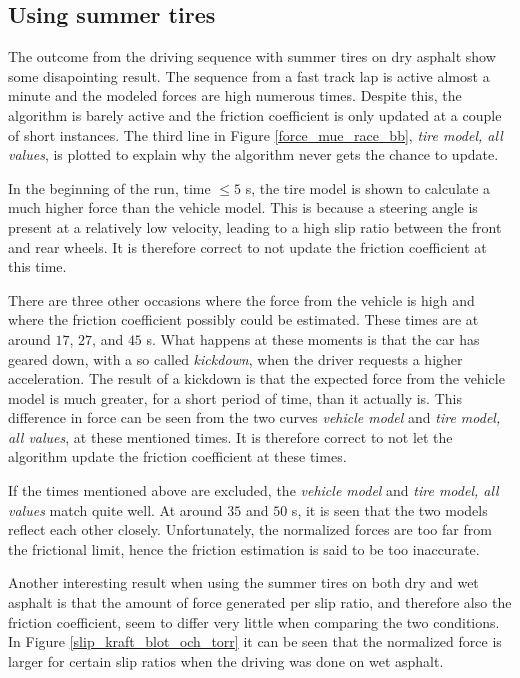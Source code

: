 \subsection{Using summer tires}
The outcome from the driving sequence with summer tires on dry asphalt show some disapointing result. The sequence from a fast track lap is active almost a minute and the modeled forces are high numerous times. Despite this, the algorithm is barely active and the friction coefficient is only updated at a couple of short instances. The third line in Figure \ref{force_mue_race_bb}, \textit{tire model, all values}, is plotted to explain why the algorithm never gets the chance to update.

In the beginning of the run, time $ \leq 5 $ s, the tire model is shown to calculate a much higher force than the vehicle model. This is because a steering angle is present at a relatively low velocity, leading to a high slip ratio between the front and rear wheels. It is therefore correct to not update the friction coefficient at this time. 

There are three other occasions where the force from the vehicle is high and where the friction coefficient possibly could be estimated. These times are at around $ 17 $, $ 27 $, and $ 45 $ s. What happens at these moments is that the car has geared down, with a so called \textit{kickdown}, when the driver requests a higher acceleration. The result of a kickdown is that the expected force from the vehicle model is much greater, for a short period of time, than it actually is. This difference in force can be seen from the two curves \textit{vehicle model} and \textit{tire model, all values}, at these mentioned times. It is therefore correct to not let the algorithm update the friction coefficient at these times.

If the times mentioned above are excluded, the \textit{vehicle model} and \textit{tire model, all values} match quite well. At around $ 35 $ and $ 50 $ s, it is seen that the two models reflect each other closely. Unfortunately, the normalized forces are too far from the frictional limit, hence the friction estimation is said to be too inaccurate.

Another interesting result when using the summer tires on both dry and wet asphalt is that the amount of force generated per slip ratio, and therefore also the friction coefficient, seem to differ very little when comparing the two conditions. In Figure \ref{slip_kraft_blot_och_torr} it can be seen that the normalized force is larger for certain slip ratios when the driving was done on wet asphalt.
